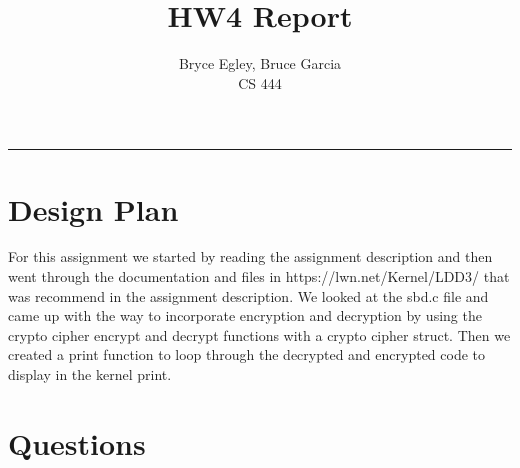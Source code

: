 \documentclass{article}
\begin{document}

\title{HW4 Report} %
\author{Bryce Egley, Bruce Garcia\\CS 444} %

\maketitle
\hrule


%
%

\section*{Design Plan}
For this assignment we started by reading the assignment description and then
went through the documentation and files in https://lwn.net/Kernel/LDD3/ that
was recommend in the assignment description. We looked at the sbd.c file and
came up with the way to incorporate encryption and decryption by using the
crypto cipher encrypt and decrypt functions with a crypto cipher struct. Then
we created a print function to loop through the decrypted and encrypted code to
display in the kernel print.
\newline


\section*{Questions}
\end{document}
